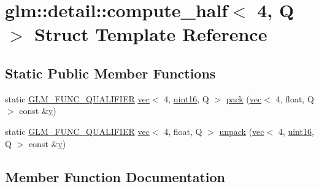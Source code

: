 \hypertarget{structglm_1_1detail_1_1compute__half_3_014_00_01_q_01_4}{}\section{glm\+:\+:detail\+:\+:compute\+\_\+half$<$ 4, Q $>$ Struct Template Reference}
\label{structglm_1_1detail_1_1compute__half_3_014_00_01_q_01_4}
\subsection*{Static Public Member Functions}
\begin{DoxyCompactItemize}
\item 
static \hyperlink{setup_8hpp_a33fdea6f91c5f834105f7415e2a64407}{G\+L\+M\+\_\+\+F\+U\+N\+C\+\_\+\+Q\+U\+A\+L\+I\+F\+I\+ER} \hyperlink{structglm_1_1vec}{vec}$<$ 4, \hyperlink{namespaceglm_1_1detail_a47b2a7d006d187338e8031a352d1ce56}{uint16}, Q $>$ \hyperlink{structglm_1_1detail_1_1compute__half_3_014_00_01_q_01_4_a93c7385a66d5c429ed3c00f97618d704}{pack} (\hyperlink{structglm_1_1vec}{vec}$<$ 4, float, Q $>$ const \&\hyperlink{_s_d_l__opengl_8h_a10a82eabcb59d2fcd74acee063775f90}{v})
\item 
static \hyperlink{setup_8hpp_a33fdea6f91c5f834105f7415e2a64407}{G\+L\+M\+\_\+\+F\+U\+N\+C\+\_\+\+Q\+U\+A\+L\+I\+F\+I\+ER} \hyperlink{structglm_1_1vec}{vec}$<$ 4, float, Q $>$ \hyperlink{structglm_1_1detail_1_1compute__half_3_014_00_01_q_01_4_a0e7bc963552dffae7fc20fc5dc2e810e}{unpack} (\hyperlink{structglm_1_1vec}{vec}$<$ 4, \hyperlink{namespaceglm_1_1detail_a47b2a7d006d187338e8031a352d1ce56}{uint16}, Q $>$ const \&\hyperlink{_s_d_l__opengl_8h_a10a82eabcb59d2fcd74acee063775f90}{v})
\end{DoxyCompactItemize}


\subsection{Member Function Documentation}
\mbox{\label{structglm_1_1detail_1_1compute__half_3_014_00_01_q_01_4_a93c7385a66d5c429ed3c00f97618d704}} 
